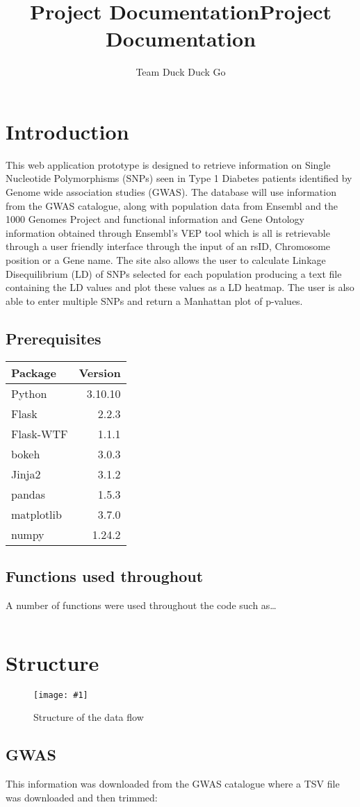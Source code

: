\documentclass[12pt,a4paper]{article}
\title{Project Documentation}
\title{\huge \textbf{Project Documentation}}
\author{Team Duck Duck Go}
\date{} 					%
\newcommand{\mintfile}[1]{
\begin{tcolorbox}[colback=gray!5!white,%
	grow to left by=20mm,
    grow to right by=20mm,
    sharp corners]{{    \small \inputminted[breaklines]{python}{#1}		}}
\end{tcolorbox}}
\newcommand{\sect}[1]{
\clearpage
\hypertarget{#1}{
\section{#1}\label{#1}}
}
\newcommand{\subsect}[1]{
\FloatBarrier %
\hypertarget{#1}{
\subsection{#1}\label{#1}}
}
\newcommand{\subsubsect}[1]{
\hypertarget{#1}{
\subsection{#1}\label{#1}}
}
\newcommand{\pic}[2]{
\begin{figure}[h]
    \centering
    \captionsetup{justification=centering}
    \texttt{[image: \#1]}
    \caption{#2}
    \label{#1}
\end{figure}
}
\begin{document}
\maketitle
\thispagestyle{empty}
\clearpage
\tableofcontents
\clearpage

\sect{Introduction}


This web application prototype is designed to retrieve information on Single Nucleotide Polymorphisms
(SNPs) seen in Type 1 Diabetes patients identified by Genome wide association studies (GWAS).
The database will use information from the GWAS catalogue, along with population data from Ensembl
and the 1000 Genomes Project and functional information and Gene Ontology information obtained through
Ensembl’s VEP tool which is all is retrievable through a user friendly interface through the input of an rsID,
Chromosome position or a Gene name. The site also allows the user to calculate Linkage Disequilibrium (LD)
of SNPs selected for each population producing a text file containing the LD values and plot these values as
a LD heatmap. The user is also able to enter multiple SNPs and return a Manhattan plot of p-values.

\subsect{Prerequisites}

\begin{tabular}{l r}
Package & Version \\
\hline
Python & 3.10.10 \\
Flask&2.2.3 \\
Flask-WTF&1.1.1 \\
bokeh&3.0.3 \\
Jinja2&3.1.2 \\
pandas&1.5.3 \\
matplotlib&3.7.0 \\
numpy&1.24.2 \\
\end{tabular}

\subsubsect{Functions used throughout}

A number of functions were used throughout the code such as\ldots{}

\mintfile{code_snippets/placeholder.py}

\sect{Structure}
\pic{structure}{Structure of the data flow}

\subsect{GWAS}

This information was downloaded from the GWAS catalogue where a TSV file was downloaded and then trimmed:
\end{document}
